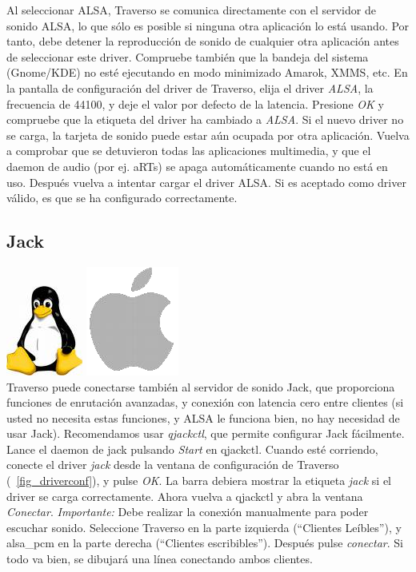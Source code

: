 Al seleccionar ALSA, Traverso se comunica directamente con el servidor de sonido ALSA, lo que sólo es posible si ninguna otra aplicación lo está usando. Por tanto, debe detener la reproducción de sonido de cualquier otra aplicación antes de seleccionar este driver. Compruebe también que la bandeja del sistema (Gnome/KDE) no esté ejecutando en modo minimizado Amarok, XMMS, etc. En la pantalla de configuración del driver de Traverso, elija el driver \emph{ALSA}, la frecuencia de 44100, y deje el valor por defecto de la latencia. Presione \emph{OK} y compruebe que la etiqueta del driver ha cambiado a \emph{ALSA}. Si el nuevo driver no se carga, la tarjeta de sonido puede estar aún ocupada por otra aplicación. Vuelva a comprobar que se detuvieron todas las aplicaciones multimedia, y que el daemon de audio (por ej. aRTs) se apaga automáticamente cuando no está en uso. Después vuelva a intentar cargar el driver ALSA. Si es aceptado como driver válido, es que se ha configurado correctamente.

\subsection{Jack}
\includegraphics[height=\baselineskip]{../images/tux.png}
\includegraphics[height=\baselineskip]{../images/mac.png}
\\

Traverso puede conectarse también al servidor de sonido Jack, que proporciona funciones de enrutación avanzadas, y conexión con latencia cero entre clientes (si usted no necesita estas funciones, y ALSA le funciona bien, no hay necesidad de usar Jack). Recomendamos usar \emph{qjackctl}, que permite configurar Jack fácilmente. Lance el daemon de jack pulsando \emph{Start} en qjackctl. Cuando esté corriendo, conecte el driver \emph{jack} desde la ventana de configuración de Traverso (\FigB\ \ref{fig_driverconf}), y pulse \emph{OK}. La barra debiera mostrar la etiqueta \emph{jack} si el driver se carga correctamente. Ahora vuelva a qjackctl y abra la ventana \emph{Conectar}. \emph{Importante:} Debe realizar la conexión manualmente para poder escuchar sonido. Seleccione Traverso en la parte izquierda (``Clientes Leíbles''), y alsa\_pcm en la parte derecha (``Clientes escribibles''). Después pulse \emph{conectar}. Si todo va bien, se dibujará una línea conectando ambos clientes.


